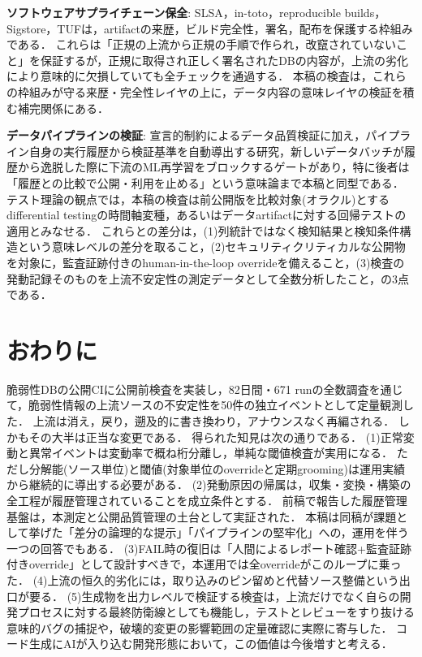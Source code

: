 \documentclass{css}
\begin{document}
\textbf{ソフトウェアサプライチェーン保全}:
SLSA\cite{slsa}，in-toto\cite{torres19}，reproducible builds\cite{lamb22}，Sigstore\cite{newman22}，TUF\cite{samuel10}は，artifactの来歴，ビルド完全性，署名，配布を保護する枠組みである．
これらは「正規の上流から正規の手順で作られ，改竄されていないこと」を保証するが，正規に取得され正しく署名されたDBの内容が，上流の劣化により意味的に欠損していても全チェックを通過する．
本稿の検査は，これらの枠組みが守る来歴・完全性レイヤの上に，データ内容の意味レイヤの検証を積む補完関係にある．

\textbf{データパイプラインの検証}:
宣言的制約によるデータ品質検証\cite{schelter18,breck19}に加え，パイプライン自身の実行履歴から検証基準を自動導出する研究\cite{tu23,redyuk21}，新しいデータバッチが履歴から逸脱した際に下流のML再学習をブロックするゲート\cite{shankar23}があり，特に後者は「履歴との比較で公開・利用を止める」という意味論まで本稿と同型である．
テスト理論の観点では，本稿の検査は前公開版を比較対象(オラクル)とするdifferential testing\cite{mckeeman98}の時間軸変種，あるいはデータartifactに対する回帰テスト\cite{yoo12}の適用とみなせる．
これらとの差分は，(1)列統計ではなく検知結果と検知条件構造という意味レベルの差分を取ること，(2)セキュリティクリティカルな公開物を対象に，監査証跡付きのhuman-in-the-loop overrideを備えること，(3)検査の発動記録そのものを上流不安定性の測定データとして全数分析したこと，の3点である．

\section{おわりに}
\label{sec:conclusion}

脆弱性DBの公開CIに公開前検査を実装し，82日間・671 runの全数調査を通じて，脆弱性情報の上流ソースの不安定性を50件の独立イベントとして定量観測した．
上流は消え，戻り，遡及的に書き換わり，アナウンスなく再編される．
しかもその大半は正当な変更である．
得られた知見は次の通りである．
(1)正常変動と異常イベントは変動率で概ね桁分離し，単純な閾値検査が実用になる．
ただし分解能(ソース単位)と閾値(対象単位のoverrideと定期grooming)は運用実績から継続的に導出する必要がある．
(2)発動原因の帰属は，収集・変換・構築の全工程が履歴管理されていることを成立条件とする．
前稿で報告した履歴管理基盤\cite{nakaoka2025}は，本測定と公開品質管理の土台として実証された．
本稿は同稿が課題として挙げた「差分の論理的な提示」「パイプラインの堅牢化」への，運用を伴う一つの回答でもある．
(3)FAIL時の復旧は「人間によるレポート確認+監査証跡付きoverride」として設計すべきで，本運用では全overrideがこのループに乗った．
(4)上流の恒久的劣化には，取り込みのピン留めと代替ソース整備という出口が要る．
(5)生成物を出力レベルで検証する検査は，上流だけでなく自らの開発プロセスに対する最終防衛線としても機能し，テストとレビューをすり抜ける意味的バグの捕捉や，破壊的変更の影響範囲の定量確認に実際に寄与した．
コード生成にAIが入り込む開発形態において，この価値は今後増すと考える．
\end{document}
